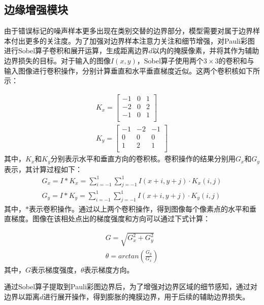 \subsection{边缘增强模块}

由于错误标记的噪声样本更多出现在类别交替的边界部分，模型需要对属于边界样本付出更多的关注度。为了加强对边界样本注意力关注和细节增强，对Pauli彩图进行Sobel算子卷积和展开运算，生成距离边界$d$以内的掩膜像素，并将其作为辅助边界损失的目标。对于输入的图像$I(x,y)$，Sobel算子使用两个$3 \times 3$的卷积和与输入图像进行卷积操作，分别计算垂直和水平垂直梯度近似。这两个卷积核如下所示：

\begin{gather}
    K_x=\left[ \begin{matrix}
            -1 & 0 & 1 \\
            -2 & 0 & 2 \\
            -1 & 0 & 1 \\
        \end{matrix} \right]
    \\
    K_y=\left[ \begin{matrix}
            -1 & -2 & -1 \\
            0  & 0  & 0  \\
            1  & 2  & 1  \\
        \end{matrix} \right]
\end{gather}
其中，$K_x$和$K_y$分别表示水平和垂直方向的卷积核。卷积操作的结果分别用$G_x$和$G_y$表示，其计算过程如下：
\begin{gather}
    G_x=I \ast K_x=\sum_{i=-1}^1{\sum_{j=-1}^1{I\left( x+i,y+j \right) \cdot K_x\left( i,j \right)}}
    \\
    G_y=I \ast K_y=\sum_{i=-1}^1{\sum_{j=-1}^1{I\left( x+i,y+j \right) \cdot K_y\left( i,j \right)}}
\end{gather}
其中，$\ast$表示卷积操作。通过以上两个卷积操作，得到图像每个像素点的水平和垂直梯度。图像在该相处点出的梯度强度和方向可以通过下式计算：

\begin{gather}
    G=\sqrt{G_x^2+G_y^2}
    \\
    \theta=arctan(\frac{G_y}{G_x})
\end{gather}
其中，$G$表示梯度强度，$\theta$表示梯度方向。

通过Sobel算子提取到Pauli彩图边界后，为了增强对边界区域的细节感知，通过对边界以距离$d$进行展开操作，得到膨胀的掩膜边界，用于后续的辅助边界损失。

